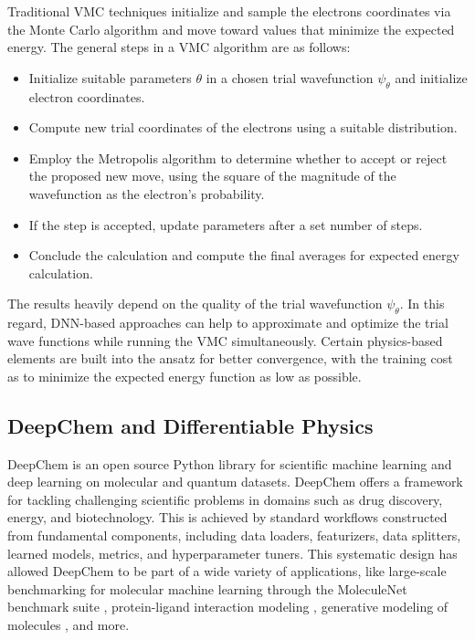 \documentclass[letterpaper]{article} %
\begin{document}
Traditional VMC techniques initialize and sample the electrons 
coordinates via the Monte Carlo algorithm and move toward values that 
minimize the expected energy. The general steps in a VMC algorithm are as follows:
\begin{itemize}
    \item Initialize suitable parameters $\theta$ in a chosen trial wavefunction $\psi_\theta$ and initialize electron coordinates.
    \item Compute new trial coordinates of the electrons using a suitable distribution.
    \item Employ the Metropolis algorithm to determine whether to accept or reject the proposed new move, using the square of the magnitude of the wavefunction as the electron's probability.
    \item If the step is accepted, update parameters after a set number of steps.
    \item Conclude the calculation and compute the final averages for expected energy calculation.
\end{itemize}

The results heavily depend on the quality of the trial wavefunction $\psi_\theta$. In this 
regard, DNN-based approaches can help to approximate and optimize the trial wave 
functions while running the VMC simultaneously. Certain physics-based elements
are built into the ansatz for better convergence, with the training cost as to 
minimize the expected energy function as low as possible. \\

\subsection{DeepChem and Differentiable Physics}
DeepChem \cite{ramsundar2021deepchem} is an open source Python library for scientific machine learning and deep learning on molecular and quantum datasets. DeepChem offers a framework for tackling challenging scientific problems in domains such as drug discovery, energy, and biotechnology. This is achieved by standard workflows constructed from fundamental components, including data loaders, featurizers, data splitters, learned models, metrics, and hyperparameter tuners. This systematic design has allowed DeepChem to be part of a wide variety of applications, like large-scale benchmarking for molecular machine learning through the
MoleculeNet benchmark suite \cite{wu2018moleculenet}, protein-ligand interaction modeling \cite{gomes2017atomic}, generative modeling of molecules \cite{frey2023fastflows}, and more.\\
\end{document}
